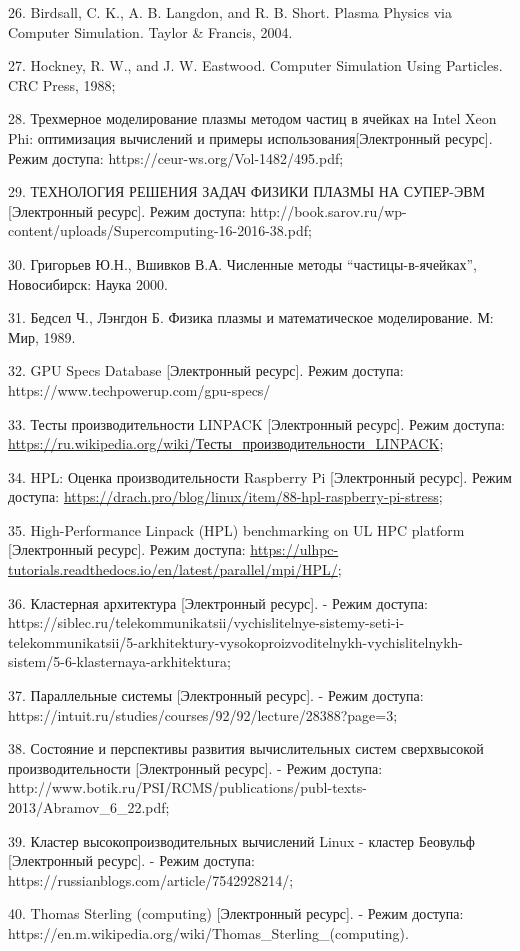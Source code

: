 \documentclass{article}
\begin{document}
26. Birdsall, C. K., A. B. Langdon, and R. B. Short. Plasma Physics via Computer Simulation. Taylor \& Francis, 2004.

27. Hockney, R. W., and J. W. Eastwood. Computer Simulation Using Particles. CRC Press, 1988;

28. Трехмерное моделирование плазмы методом частиц в
ячейках на Intel Xeon Phi: оптимизация вычислений и примеры использования[Электронный ресурс]. Режим доступа: https://ceur-ws.org/Vol-1482/495.pdf;

29. ТЕХНОЛОГИЯ РЕШЕНИЯ ЗАДАЧ ФИЗИКИ ПЛАЗМЫ НА СУПЕР-ЭВМ [Электронный ресурс]. Режим доступа: http://book.sarov.ru/wp-content/uploads/Supercomputing-16-2016-38.pdf;

30. Григорьев Ю.Н., Вшивков В.А. Численные методы “частицы-в-ячейках”, Новосибирск: Наука 2000.

31. Бедсел Ч., Лэнгдон Б. Физика плазмы и математическое моделирование. М: Мир, 1989.

32.  GPU Specs Database [Электронный ресурс]. Режим доступа: https://www.techpowerup.com/gpu-specs/

33. Тесты производительности LINPACK [Электронный ресурс].
Режим доступа: \href{https://ru.wikipedia.org/wiki/\%D0\%A2\%D0\%B5\%D1\%81\%D1\%82\%D1\%8B_\%D0\%BF\%D1\%80\%D0\%BE\%D0\%B8\%D0\%B7\%D0\%B2\%D0\%BE\%D0\%B4\%D0\%B8\%D1\%82\%D0\%B5\%D0\%BB\%D1\%8C\%D0\%BD\%D0\%BE\%D1\%81\%D1\%82\%D0\%B8_LINPACK}{https://ru.wikipedia.org/wiki/Тесты\_производительности\_LINPACK};

34. HPL: Оценка производительности Raspberry Pi [Электронный ресурс]. Режим доступа: \href{https://drach.pro/blog/linux/item/88-hpl-raspberry-pi-stress}{https://drach.pro/blog/linux/item/88-hpl-raspberry-pi-stress};

35. High-Performance Linpack (HPL) benchmarking on UL HPC platform [Электронный ресурс]. Режим доступа: \href{https://ulhpc-tutorials.readthedocs.io/en/latest/parallel/mpi/HPL/}{https://ulhpc-tutorials.readthedocs.io/en/latest/parallel/mpi/HPL/};

36. Кластерная архитектура [Электронный ресурс].
   - Режим доступа: https://siblec.ru/telekommunikatsii/vychislitelnye-sistemy-seti-i-telekommunikatsii/5-arkhitektury-vysokoproizvoditelnykh-vychislitelnykh-sistem/5-6-klasternaya-arkhitektura;

37. Параллельные системы [Электронный ресурс].
   - Режим доступа: https://intuit.ru/studies/courses/92/92/lecture/28388?page=3;

38. Состояние и перспективы развития вычислительных систем сверхвысокой производительности [Электронный ресурс].
   - Режим доступа: http://www.botik.ru/PSI/RCMS/publications/publ-texts-2013/Abramov\_6\_22.pdf;

39. Кластер высокопроизводительных вычислений Linux - кластер Беовульф [Электронный ресурс].
   - Режим доступа: https://russianblogs.com/article/7542928214/;

40. Thomas Sterling (computing) [Электронный ресурс].
   - Режим доступа: https://en.m.wikipedia.org/wiki/Thomas\_Sterling\_(computing).
\end{document}
